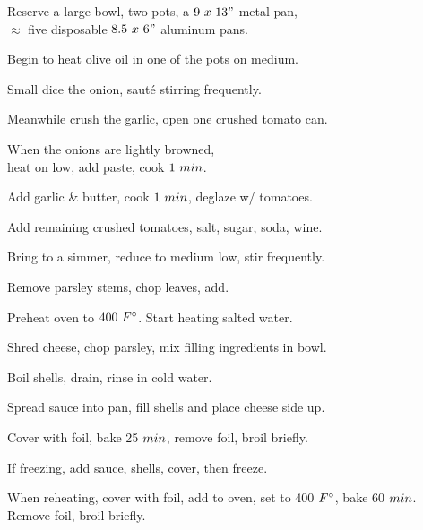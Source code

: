\begin{preparation}
\item Reserve a large bowl, two pots, a $9~x~13"$ metal pan,\\
	$\approx$ five disposable $8.5~x~6"$ aluminum pans.
\item Begin to heat olive oil in one of the pots on medium.
\item Small dice the onion, saut\'{e} stirring frequently.
\item Meanwhile crush the garlic, open one crushed tomato can.
\item When the onions are lightly browned,\\
	heat on low, add paste, cook $1~\minute$.
\item Add garlic \& butter, cook $1~\minute$, deglaze w/ tomatoes.
\item Add remaining crushed tomatoes, salt, sugar, soda, wine.
\item Bring to a simmer, reduce to medium low, stir frequently.
\item Remove parsley stems, chop leaves, add.
\item Preheat oven to $400~\Fahrenheit$.
	Start heating salted water.
\item Shred cheese, chop parsley, mix filling ingredients in bowl.
\item Boil shells, drain, rinse in cold water.
\item Spread sauce into pan, fill shells and place cheese side up.
\item Cover with foil, bake 25 $\minute$, remove foil, broil briefly.
\item If freezing, add sauce, shells, cover, then freeze.
\item When reheating, cover with foil, add to oven, set to 400 $\Fahrenheit$, bake 60 $\minute$. Remove foil, broil briefly.
\end{preparation}


\recipeend%
